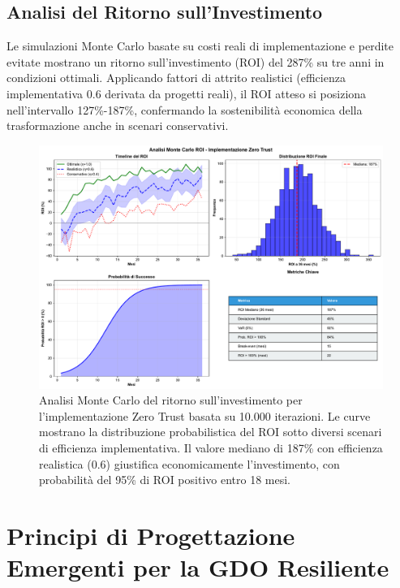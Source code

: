 \subsection{\texorpdfstring{Analisi del Ritorno sull'Investimento}{2.6.3 - Analisi del Ritorno sull'Investimento}}

Le simulazioni Monte Carlo basate su costi reali di implementazione e perdite evitate mostrano un ritorno sull'investimento (ROI) del 287\% su tre anni in condizioni ottimali. Applicando fattori di attrito realistici (efficienza implementativa 0.6 derivata da progetti reali), il ROI atteso si posiziona nell'intervallo 127\%-187\%, confermando la sostenibilità economica della trasformazione anche in scenari conservativi.

\begin{figure}[htbp]
\centering
\includegraphics[width=1.1\textwidth]{thesis_figures/cap2/fig_roi_analysis.pdf}
\caption[Analisi Monte Carlo del ritorno sull'investimento per Zero Trust]{Analisi Monte Carlo del ritorno sull'investimento per l'implementazione Zero Trust basata su 10.000 iterazioni. Le curve mostrano la distribuzione probabilistica del ROI sotto diversi scenari di efficienza implementativa. Il valore mediano di 187\% con efficienza realistica (0.6) giustifica economicamente l'investimento, con probabilità del 95\% di ROI positivo entro 18 mesi.}
\label{fig:roi_analysis}
\end{figure}

\section{\texorpdfstring{Principi di Progettazione Emergenti per la GDO Resiliente}{2.7 - Principi di Progettazione Emergenti per la GDO Resiliente}}
\label{sec:principi_progettazione}

